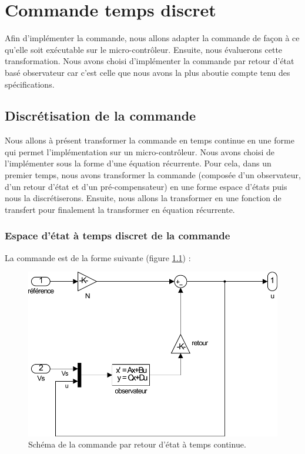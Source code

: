 \chapter{Commande temps discret}
Afin d'implémenter la commande, nous allons adapter la commande de façon à ce qu'elle soit exécutable sur le micro-contrôleur. Ensuite, nous évaluerons cette transformation. Nous avons choisi d'implémenter la commande par retour d'état basé observateur car c'est celle que nous avons la plus aboutie compte tenu des spécifications. 
\section{Discrétisation de la commande}
Nous allons à présent transformer la commande en temps continue en une forme qui permet l'implémentation sur un micro-contrôleur. Nous avons choisi de l'implémenter sous la forme d'une équation récurrente. Pour cela, dans un premier temps, nous avons transformer la commande (composée d'un observateur, d'un retour d'état et d'un pré-compensateur) en une forme espace d'états puis nous la discrétiserons. Ensuite, nous allons la transformer en une fonction de transfert pour finalement la transformer en équation récurrente.
	\subsection{Espace d'état à temps discret de la commande}
La commande est de la forme suivante (figure \ref{fig:comTC}) : 
\begin{figure}[!ht]
\centering
\includegraphics[width=.4\textwidth]{./V/images/Com_asserv.pdf}
\caption{\label{fig:comTC}Schéma de la commande par retour d'état à temps continue.}
\end{figure}


